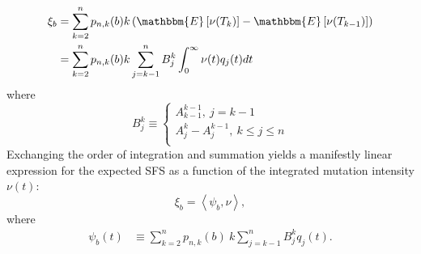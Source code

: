 \documentclass[11pt]{article}
\begin{document}
\begin{align*}
\xi_b &= \sum_{k=2}^n p_{n,k}(b) k \left(\mathbbm{E}\left[\nu(T_{k})\right] - \mathbbm{E}\left[\nu(T_{k-1})\right]\right)\\
&= \sum_{k=2}^n p_{n,k}(b) k \sum_{j=k-1}^{n}B_j^k\int_0^\infty\nu(t)q_j(t)dt
\end{align*}
where
\[
B_j^k \equiv
\begin{cases}
A_{k-1}^{k-1},\ j=k-1\\
A_j^k - A_j^{k-1},\ k\le j\le n\\
\end{cases}
\]
Exchanging the order of integration and summation yields a manifestly linear expression for the expected SFS as a function of the integrated mutation intensity $\nu(t)$:
\[
\xi_b = \left<\psi_b, \nu\right>,
\]
where
\begin{align*}
\psi_b(t) &\equiv \sum_{k=2}^n p_{n,k}(b)\ k \sum_{j=k-1}^{n}B_j^k q_j(t).
\end{align*}
\end{document}
